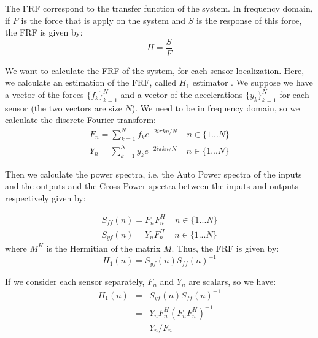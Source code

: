 \documentclass[journal]{IEEEtran}
\begin{document}
The FRF correspond to the transfer function of the system. In frequency domain, if $F$ is the force that is apply on the system and $S$ is the response of this force, the FRF is given by:
\begin{equation}
H = \frac{S}{F}
\end{equation} 

We want to calculate the FRF of the system, for each sensor localization. Here, we calculate an estimation of the FRF, called $H_1$ estimator \cite{cauberghe2004applied}. We suppose we have a vector of the forces $\{ f_k\}_{k=1}^N$ and a vector of the accelerations $\{ y_k\}_{k=1}^N$ for each sensor (the two vectors are size $N$). We need to be in frequency domain, so we calculate the discrete Fourier transform:
\begin{equation}
\begin{array}{ll}
F_n = \sum\limits_{k=1}^N f_k e^{-2i\pi kn/N} \ \ \ \ \ n \in \{1 ... N\} \\
Y_n = \sum\limits_{k=1}^N y_k e^{-2i\pi kn/N} \ \ \ \ \ n \in \{1 ... N\}
\end{array}
\end{equation}

Then we calculate the power spectra, i.e. the Auto Power spectra of the inputs and the outputs
and the Cross Power spectra between the inputs and outputs respectively given by:

\begin{equation}
\begin{array}{ll}
S_{ff}(n) = F_n F_n^H \ \ \ \ \ n \in \{1 ... N\} \\
S_{yf}(n) = Y_n F_n^H \ \ \ \ \ n \in \{1 ... N\}
\end{array}
\end{equation}
where $M^H$ is the Hermitian of the matrix $M$. Thus, the FRF is given by:
\begin{equation}
H_1(n) = S_{yf}(n) S_{ff}(n)^{-1}
\end{equation}

\begin{remark}
If we consider each sensor separately, $F_n$ and $Y_n$ are scalars, so we have:
\begin{equation}
\begin{array}{lll}
H_1(n) & = & S_{yf}(n) S_{ff}(n)^{-1} \\
& = & Y_n F_n^H (F_n F_n^H)^{-1} \\
& = & Y_n / F_n
\end{array}
\end{equation}
\end{remark}
\end{document}
